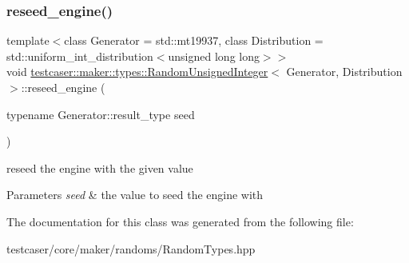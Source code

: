 \subsubsection{\texorpdfstring{reseed\+\_\+engine()}{reseed\_engine()}}
{\footnotesize\ttfamily template$<$class Generator = std\+::mt19937, class Distribution = std\+::uniform\+\_\+int\+\_\+distribution$<$unsigned long long$>$$>$ \\
void \hyperlink{classtestcaser_1_1maker_1_1types_1_1RandomUnsignedInteger}{testcaser\+::maker\+::types\+::\+Random\+Unsigned\+Integer}$<$ Generator, Distribution $>$\+::reseed\+\_\+engine (\begin{DoxyParamCaption}\item[{typename Generator\+::result\+\_\+type}]{seed }\end{DoxyParamCaption})\hspace{0.3cm}{\ttfamily [inline]}}



reseed the engine with the given value 


\begin{DoxyParams}{Parameters}
{\em seed} & the value to seed the engine with \\
\hline
\end{DoxyParams}


The documentation for this class was generated from the following file\+:\begin{DoxyCompactItemize}
\item 
testcaser/core/maker/randoms/Random\+Types.\+hpp\end{DoxyCompactItemize}

